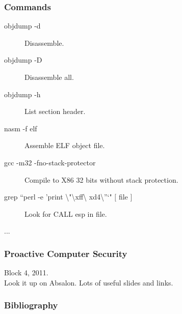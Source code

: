 \documentclass[slidestop,compress,mathserif, xcolor=table]{beamer}
\begin{document}
\begin{frame}
  \frametitle{Commands}

  \begin{description}
  \item[objdump -d] Disassemble.
  \item[objdump -D] Disassemble all.
  \item[objdump -h] List section header.
  \item[nasm -f elf] Assemble ELF object file.
  \item[gcc -m32 -fno-stack-protector] Compile to X86 32 bits without stack
    protection.
  \item[grep "`perl -e 'print \textbackslash "\textbackslash xff\textbackslash
    xd4\textbackslash "'`" $\lbrack$ file $\rbrack$]
    Look for CALL esp in file.
  \item[...]
  \end{description}
\end{frame}

\begin{frame}
  \frametitle{Proactive Computer Security}

  Block 4, 2011.\\[1em]

  Look it up on Absalon. Lots of useful slides and links.
\end{frame}

\begin{frame}[allowframebreaks]
  \frametitle{Bibliography}
  \tiny
  
  
\end{frame}
\end{document}
